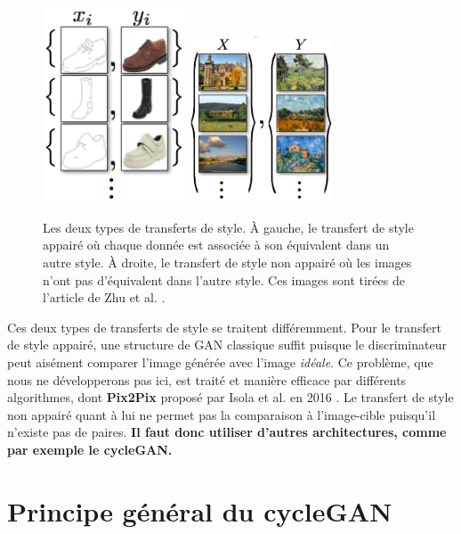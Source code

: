 \begin{figure}[!h]
\centering
\includegraphics[width=120pt,valign=t]{"images/cycle/paire"}
\hspace*{10mm}
\includegraphics[width=120pt,valign=t]{"images/cycle/pairepas"}
\caption{Les deux types de transferts de style. À gauche, le transfert de style appairé où chaque donnée est associée à son équivalent dans un autre style. À droite, le transfert de style non appairé où les images n'ont pas d'équivalent dans l'autre style. Ces images sont tirées de l'article de Zhu et al. \cite{zhu_unpaired_2018}.}
\label{paire}
\end{figure}

Ces deux types de transferts de style se traitent différemment. Pour le transfert de style appairé, une structure de GAN classique suffit puisque le discriminateur peut aisément comparer l'image générée avec l'image \textit{idéale}. Ce problème, que nous ne développerons pas ici, est traité et manière efficace par différents algorithmes, dont \textbf{Pix2Pix} proposé par Isola et al. en 2016 \cite{isola_image--image_2018}. Le transfert de style non appairé quant à lui ne permet pas la comparaison à l'image-cible puisqu'il n'existe pas de paires. \textbf{Il faut donc utiliser d'autres architectures, comme par exemple le cycleGAN.}


\section{Principe général du cycleGAN}

